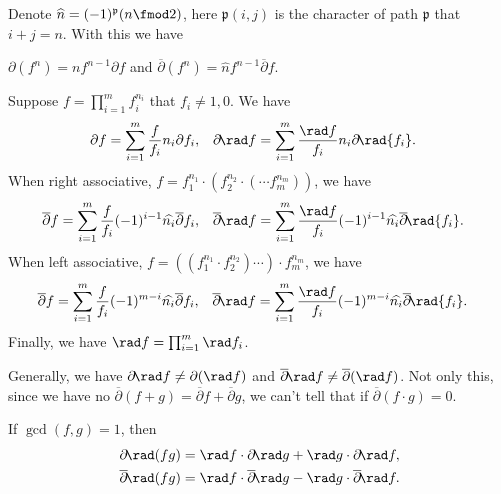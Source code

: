 Denote $\widehat{n} = (-1)^{\mathfrak{p}}(n\fmod 2)$, here $\mathfrak{p}(i,j)$ is the character of path $\mathfrak{p}$ that $i + j = n$. With this we have
\begin{proposition}
	$\partial(f^{n}) = nf^{n-1}\partial f$ and $\overline{\partial}(f^{n}) = \widehat{n}f^{n-1}\overline{\partial}f$.
\end{proposition}
\begin{proposition}\label{prop:operator-are-separable}
	Suppose $f = \prod_{i=1}^{m}f_{i}^{n_i}$ that $f_i\ne 1, 0$.  We have
	\begin{align*}
		\partial f &= \sum_{i=1}^{m}\frac{f}{f_i}n_i\partial{f_i}, & \partial\!\rad f &= \sum_{i=1}^{m}\frac{\rad f}{f_i}n_i\partial\!\rad{f_i}.
	\end{align*}
	When right associative, $f = f_1^{n_1}\cdot (f_2^{n_2}\cdot (\cdots f_m^{n_m}))$, we have
	\begin{align*}
		\overline{\partial}f &= \sum_{i=1}^{m}\frac{f}{f_i}(-1)^{i-1}\widehat{n_i}\overline{\partial}{f_i}, & \overline{\partial}\!\rad f  &= \sum_{i=1}^{m}\frac{\rad f}{f_i}(-1)^{i-1}\widehat{n_i}\overline{\partial}\!\rad{f_i}.
	\end{align*}
	When left associative, $f = ((f_1^{n_1}\cdot f_2^{n_2}) \cdots) \cdot f_m^{n_m}$, we have
	\begin{align*}
		\overline{\partial}f &= \sum_{i=1}^{m}\frac{f}{f_i}(-1)^{m-i}\widehat{n_i}\overline{\partial}{f_i}, &\overline{\partial}\!\rad f  &= \sum_{i=1}^{m}\frac{\rad f}{f_i}(-1)^{m-i}\widehat{n_i}\overline{\partial}\!\rad{f_i}.
	\end{align*}
	Finally, we have $\rad f = \prod_{i=1}^{m}\rad f_{i}$.
\end{proposition}
Generally, we have $\partial\!\rad f \ne \partial(\rad f)$ and $\overline{\partial}\!\rad f \ne \overline{\partial}(\rad f)$. Not only this, since we have no $\overline{\partial}(f+g) = \overline{\partial} f + \overline{\partial} g$, we can't tell that if $\overline{\partial}(f\cdot g) = 0$.
\begin{proposition}
	If $\gcd(f, g) = 1$, then
	\begin{align*}
		\partial\!\rad(fg) &= \rad f\cdot \partial\!\rad g + \rad g\cdot \partial\!\rad f, \\
		\overline{\partial}\!\rad(fg) &= \rad f\cdot \overline{\partial}\!\rad g - \rad g\cdot \overline{\partial}\!\rad f.
	\end{align*}
\end{proposition}

